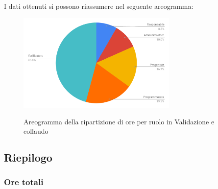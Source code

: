 \pagebreak
I dati ottenuti si possono riassumere nel seguente areogramma:
\begin{figure}[H] 
			\centering 
				\includegraphics[width=0.7\textwidth]{res/images/areogramma_validazione.pdf}\\
				\caption{Areogramma della ripartizione di ore per ruolo in Validazione e collaudo}
			\label{AreogrammaValidazione}
\end{figure}


\subsection{Riepilogo}
\subsubsection{Ore totali}
